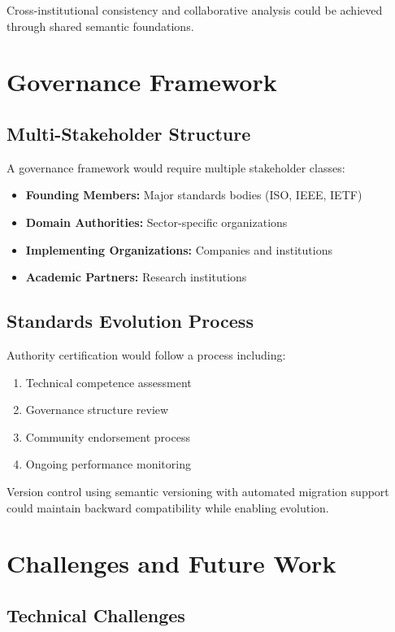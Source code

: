 \documentclass[conference]{IEEEtran}
\begin{document}
Cross-institutional consistency and collaborative analysis could be achieved through shared semantic foundations.

\section{Governance Framework}

\subsection{Multi-Stakeholder Structure}

A governance framework would require multiple stakeholder classes:

\begin{itemize}
\item \textbf{Founding Members:} Major standards bodies (ISO, IEEE, IETF)
\item \textbf{Domain Authorities:} Sector-specific organizations
\item \textbf{Implementing Organizations:} Companies and institutions
\item \textbf{Academic Partners:} Research institutions
\end{itemize}

\subsection{Standards Evolution Process}

Authority certification would follow a process including:

\begin{enumerate}
\item Technical competence assessment
\item Governance structure review
\item Community endorsement process
\item Ongoing performance monitoring
\end{enumerate}

Version control using semantic versioning with automated migration support could maintain backward compatibility while enabling evolution.

\section{Challenges and Future Work}

\subsection{Technical Challenges}
\end{document}
